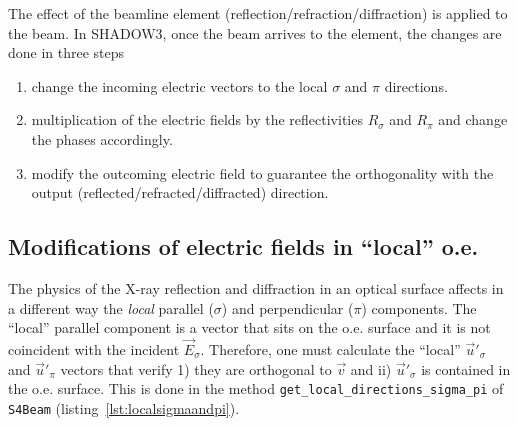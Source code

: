 \documentclass{iucr}
\begin{document}
The effect of the beamline element (reflection/refraction/diffraction) is applied to the beam. In SHADOW3, once the beam arrives to the element, the changes are done in three steps 
\begin{enumerate}
    \item change the incoming electric vectors to the local $\sigma$ and $\pi$ directions.
    \item multiplication of the electric fields by the reflectivities $R_\sigma$ and $R_\pi$ and change the phases accordingly.
    \item modify the outcoming electric field to guarantee the orthogonality with the output (reflected/refracted/diffracted) direction.
\end{enumerate}

\subsection{Modifications of electric fields in ``local'' o.e.}
\label{sec:localoe}


The physics of the X-ray reflection and diffraction in an optical surface affects in a different way 
the {\it local} parallel ($\sigma$) and perpendicular ($\pi$) components. The ``local'' parallel component
is a vector that sits on the o.e. surface and it is not coincident with the incident $\vec{E}_\sigma$.
Therefore, one must calculate the ``local'' $\vec{u}'_\sigma$ and $\vec{u}'_\pi$ vectors that verify
1) they are orthogonal to $\vec{v}$ and ii) $\vec{u}'_\sigma$ is contained in the o.e. surface. 
This is done in the method {\tt get\_local\_directions\_sigma\_pi} of {\tt S4Beam} (listing~\ref{lst:localsigmaandpi}).

\end{document}

